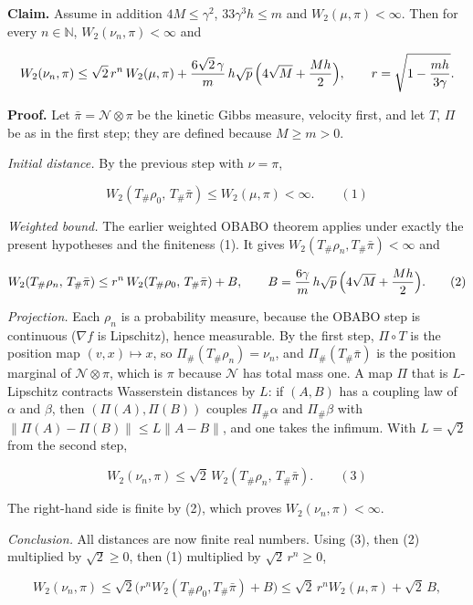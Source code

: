 \documentclass[11pt,a4paper]{article}
\begin{document}
\textbf{Claim.} Assume in addition \(4M\le\gamma^2\), \(33\gamma^3h\le m\) and \(W_2(\mu,\pi)<\infty\). Then for every \(n\in\mathbb N\), \(W_2(\nu_n,\pi)<\infty\) and


\[W_2(\nu_n,\pi)\le\sqrt2\,r^n\,W_2(\mu,\pi)+\frac{6\sqrt2\,\gamma}{m}\,h\sqrt p\,\Bigl(4\sqrt M+\frac{Mh}{2}\Bigr),\qquad r=\sqrt{1-\frac{mh}{3\gamma}}.\]


\textbf{Proof.} Let \(\bar\pi=\mathcal N\otimes\pi\) be the kinetic Gibbs measure, velocity first, and let \(T\), \(\Pi\) be as in the first step; they are defined because \(M\ge m>0\).




\emph{Initial distance.} By the previous step with \(\nu=\pi\),


\[W_2(T_\#\rho_0,\,T_\#\bar\pi)\le W_2(\mu,\pi)<\infty.\qquad(1)\]


\emph{Weighted bound.} The earlier weighted OBABO theorem \cite[Section~3.122.3]{LangevinLean2026Kinetic} applies under exactly the present hypotheses and the finiteness (1). It gives \(W_2(T_\#\rho_n,T_\#\bar\pi)<\infty\) and


\[W_2(T_\#\rho_n,\,T_\#\bar\pi)\le r^n\,W_2(T_\#\rho_0,\,T_\#\bar\pi)+B,\qquad B=\frac{6\gamma}{m}\,h\sqrt p\,\Bigl(4\sqrt M+\frac{Mh}{2}\Bigr).\qquad(2)\]


\emph{Projection.} Each \(\rho_n\) is a probability measure, because the OBABO step is continuous (\(\nabla f\) is Lipschitz), hence measurable. By the first step, \(\Pi\circ T\) is the position map \((v,x)\mapsto x\), so \(\Pi_\#(T_\#\rho_n)=\nu_n\), and \(\Pi_\#(T_\#\bar\pi)\) is the position marginal of \(\mathcal N\otimes\pi\), which is \(\pi\) because \(\mathcal N\) has total mass one. A map \(\Pi\) that is \(L\)-Lipschitz contracts Wasserstein distances by \(L\): if \((A,B)\) has a coupling law of \(\alpha\) and \(\beta\), then \((\Pi(A),\Pi(B))\) couples \(\Pi_\#\alpha\) and \(\Pi_\#\beta\) with \(\|\Pi(A)-\Pi(B)\|\le L\|A-B\|\), and one takes the infimum. With \(L=\sqrt2\) from the second step,


\[W_2(\nu_n,\pi)\le\sqrt2\,W_2(T_\#\rho_n,\,T_\#\bar\pi).\qquad(3)\]


The right-hand side is finite by (2), which proves \(W_2(\nu_n,\pi)<\infty\).




\emph{Conclusion.} All distances are now finite real numbers. Using (3), then (2) multiplied by \(\sqrt2\ge0\), then (1) multiplied by \(\sqrt2\,r^n\ge0\),


\[W_2(\nu_n,\pi)\le\sqrt2\bigl(r^nW_2(T_\#\rho_0,T_\#\bar\pi)+B\bigr)\le\sqrt2\,r^nW_2(\mu,\pi)+\sqrt2\,B,\]
\end{document}
